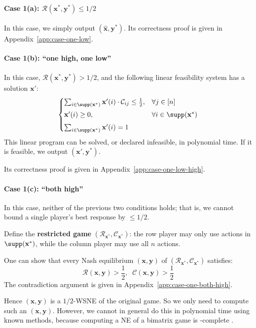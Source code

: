 \paragraph{Case 1(a): \(\mathcal{R}(\mathbf{x}^*, \mathbf{y}^*) \le 1/2\)}
In this case, we simply output \((\hat{\mathbf{x}}, \mathbf{y}^*)\). Its correctness proof is given in Appendix~\ref{app:case-one-low}.

\paragraph{Case 1(b): ``one high, one low''}
In this case, \(\mathcal{R}(\mathbf{x}^*, \mathbf{y}^*) > 1/2\), and the following linear feasibility system has a solution \(\mathbf{x}'\):
\[
  \begin{cases}
    \sum_{i \in \supp(\mathbf{x}^*)} \mathbf{x}'(i) \cdot \mathcal{C}_{ij} \le \frac12, & \forall j \in [n]                 \\[4pt]
    \mathbf{x}'(i) \ge 0,                                                               & \forall i \in \supp(\mathbf{x}^*) \\[4pt]
    \sum_{i \in \supp(\mathbf{x}^*)} \mathbf{x}'(i) = 1
  \end{cases}
\]
This linear program can be solved, or declared infeasible, in polynomial time.
If it is feasible, we output \((\mathbf{x}', \mathbf{y}^*)\).

Its correctness proof is given in Appendix~\ref{app:case-one-low-high}.

\paragraph{Case 1(c): ``both high''}
In this case, neither of the previous two conditions holds; that is, we cannot bound a single player's best response by \(\le 1/2\).

Define the \textbf{restricted game} \((\mathcal{R}_{\mathbf{x}^*}, \mathcal{C}_{\mathbf{x}^*})\): the row player may only use actions in \(\supp(\mathbf{x}^*)\), while the column player may use all \(n\) actions.

One can show that every Nash equilibrium \((\mathbf{x}, \mathbf{y})\) of \((\mathcal{R}_{\mathbf{x}^*}, \mathcal{C}_{\mathbf{x}^*})\) satisfies:
\[
  \mathcal{R}(\mathbf{x}, \mathbf{y}) > \frac12,\;\; \mathcal{C}(\mathbf{x}, \mathbf{y}) > \frac12
\]
The contradiction argument is given in Appendix~\ref{app:case-one-both-high}.

Hence \((\mathbf{x}, \mathbf{y})\) is a \(1/2\)-WSNE of the original game. So we only need to compute such an \((\mathbf{x}, \mathbf{y})\). However, we cannot in general do this in polynomial time using known methods, because computing a NE of a bimatrix game is \PPAD-complete \cite{DGP09}.

